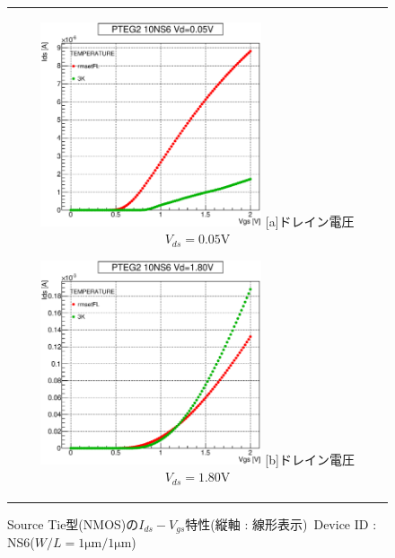 			\begin{figure}[htbp]
				\begin{center}
					\begin{tabular}{c}
						\begin{minipage}{0.5\hsize}
							\begin{center}
								\includegraphics[clip, width=6.5cm]{./Chapter/Appendix/Picture/NST/NS6/PTEG10_NS6_IdVg_0.05_.linear_.eps}
								\hspace{1.6cm} [a]ドレイン電圧$V_{ds}=0.05\mathrm{V}$
							\end{center}
						\end{minipage}
						\begin{minipage}{0.5\hsize}
							\begin{center}
								\includegraphics[clip, width=6.5cm]{./Chapter/Appendix/Picture/NST/NS6/PTEG10_NS6_IdVg_1.80_.linear_.eps}
								\hspace{1.6cm} [b]ドレイン電圧$V_{ds}=1.80\mathrm{V}$
							\end{center}
						\end{minipage}
					\end{tabular}
					\caption{Source Tie型(NMOS)の$I_{ds}-V_{gs}$特性(縦軸 : 線形表示)\ Device ID : NS6($W/L = 1\mathrm{\mu m} / 1\mathrm{\mu m}$)}
					\label{fig:ST_N_IdVg_Vth}
				\end{center}
			\end{figure}
			\clearpage

